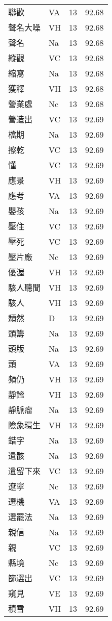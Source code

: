 \documentclass[twocolumn]{book}
\begin{document}
\begin{supertabular}{llrr}
聯歡 & VA & 13 &  92.68\\
聲名大噪 & VH & 13 &  92.68\\
聲名 & Na & 13 &  92.68\\
縱觀 & VC & 13 &  92.68\\
縮寫 & Na & 13 &  92.68\\
獲釋 & VH & 13 &  92.68\\
營業處 & Nc & 13 &  92.68\\
營造出 & VC & 13 &  92.69\\
檔期 & Na & 13 &  92.69\\
擦乾 & VC & 13 &  92.69\\
懂 & VC & 13 &  92.69\\
應景 & VH & 13 &  92.69\\
應考 & VA & 13 &  92.69\\
嬰孩 & Na & 13 &  92.69\\
壓住 & VC & 13 &  92.69\\
壓死 & VC & 13 &  92.69\\
壓片廠 & Nc & 13 &  92.69\\
優渥 & VH & 13 &  92.69\\
駭人聽聞 & VH & 13 &  92.69\\
駭人 & VH & 13 &  92.69\\
頹然 & D & 13 &  92.69\\
頭籌 & Na & 13 &  92.69\\
頭版 & Na & 13 &  92.69\\
頭 & VA & 13 &  92.69\\
頻仍 & VH & 13 &  92.69\\
靜謐 & VH & 13 &  92.69\\
靜脈瘤 & Na & 13 &  92.69\\
險象環生 & VH & 13 &  92.69\\
錯字 & Na & 13 &  92.69\\
遺骸 & Na & 13 &  92.69\\
遺留下來 & VC & 13 &  92.69\\
遼寧 & Nc & 13 &  92.69\\
選機 & VA & 13 &  92.69\\
選罷法 & Na & 13 &  92.69\\
親信 & Na & 13 &  92.69\\
親 & VC & 13 &  92.69\\
縣境 & Nc & 13 &  92.69\\
篩選出 & VC & 13 &  92.69\\
窺見 & VE & 13 &  92.69\\
積雪 & VH & 13 &  92.69\\

\end{supertabular}
\end{document}
